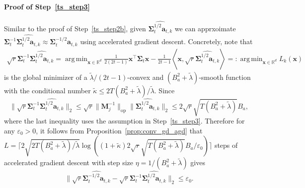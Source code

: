 \documentclass[10pt]{article}
\newcommand{\eps}{\varepsilon}
\DeclareMathOperator*{\argmin}{arg\,min}
\newcommand{\lops}[1]{\|{#1}\|_{\mathrm{op}}}
\newcommand{\<}{\left\langle}
\renewcommand{\>}{\right\rangle}
\newcommand{\R}{\mathbb{R}}
\newcommand{\Tpscov}{{{\mathbf\Sigma}}}
\newcommand{\Tpsparn}{{r}} %
\newcommand{\padecond}{{\tilde \kappa}}
\newcommand{\intmat}{{\mathbf {M}}}
\def\ba{{\mathbf a}}
\def\bx{{\mathbf x}}
\begin{document}
\paragraph{Proof of Step~\ref{ts_step3}}
Similar to the proof of Step~\ref{ts_step2b}, given $\widehat{\Tpscov_t^{1/2}\ba_{t,k}}$ we can apprxoimate $\Tpscov_t^{-1}\widehat{\Tpscov_t^{1/2}\ba_{t,k}}\approx \Tpscov_t^{-1/2}\ba_{t,k}$ using accelerated gradient descent. Concretely, note that 
\begin{align*}
   \sqrt{\Tpsparn}\Tpscov_t^{-1}\widehat{\Tpscov_t^{1/2}\ba_{t,k}} =\argmin_{\bx\in\R^d}\frac{1}{2(2t-1)}\bx^\top\Tpscov_t\bx-\frac{1}{2t-1}\<\bx,  \sqrt{\Tpsparn}\widehat{\Tpscov_t^{1/2}\ba_{t,k}}\>=:\argmin_{\bx\in\R^d} L_{k}(\bx)
\end{align*}
is the global minimizer of a $\tilde\lambda/(2t-1)$-convex and $(B_a^2+\tilde\lambda)$-smooth function with the conditional number $\padecond\leq 2T(B_a^2+\tilde\lambda)/\tilde\lambda$. Since 
$$
\|\sqrt{\Tpsparn}\Tpscov_t^{-1}\widehat{\Tpscov_t^{1/2}\ba_{t,k}} \|_2\leq\sqrt{\Tpsparn}\lops{\intmat_j^{-1}}\|\widehat{\Tpscov_t^{1/2}\ba_{t,k}} \|_2\leq 2\sqrt{\Tpsparn}\sqrt{T(B_a^2+\tilde\lambda)}B_a,$$
where the last inequality uses the assumption in Step~\ref{ts_step3}.
Therefore for any $\eps_0>0$, it follows from Proposition~\ref{prop:conv_gd_agd} that
$L=\lceil2\sqrt{2 T(B_a^2+\tilde\lambda)/\tilde\lambda}\log((1+\padecond)2\sqrt{\Tpsparn}\sqrt{T(B_a^2+\tilde\lambda)}B_a/\eps_0)\rceil$ steps of accelerated gradient descent with step size $\eta=1/(B_a^2+\tilde\lambda)$ gives  $$\|\sqrt{\Tpsparn}\widehat{\Tpscov_t^{-1/2}\ba_{t,k}} -\sqrt{\Tpsparn}\Tpscov_t^{-1}\widehat{\Tpscov_t^{1/2}\ba_{t,k}} \|_2\leq\eps_0.$$ 
\end{document}
